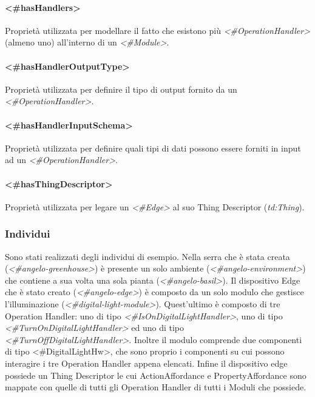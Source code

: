 \paragraph{<\#hasHandlers>}
Proprietà utilizzata per modellare il fatto che esistono più \textit{<\#OperationHandler>} (almeno uno) all'interno di un \textit{<\#Module>}.
\paragraph{<\#hasHandlerOutputType>}
Proprietà utilizzata per definire il tipo di output fornito da un \textit{<\#OperationHandler>}.
\paragraph{<\#hasHandlerInputSchema>}
Proprietà utilizzata per definire quali tipi di dati possono essere forniti in input ad un \textit{<\#OperationHandler>}.
\paragraph{<\#hasThingDescriptor>}
Proprietà utilizzata per legare un \textit{<\#Edge>} al suo Thing Descriptor (\textit{td:Thing}).

\subsubsection{Individui}
Sono stati realizzati degli individui di esempio. Nella serra che è stata creata (\textit{<\#angelo-greenhouse>}) è presente un solo ambiente (\textit{<\#angelo-environment>}) che contiene a sua volta una sola pianta (\textit{<\#angelo-basil>}). Il dispositivo Edge che è stato creato (\textit{<\#angelo-edge>}) è composto da un solo modulo che gestisce l'illuminazione (\textit{<\#digital-light-module>}). Quest'ultimo è composto di tre Operation Handler: uno di tipo \textit{<\#IsOnDigitalLightHandler>}, uno di tipo \textit{<\#TurnOnDigitalLightHandler>} ed uno di tipo \textit{<\#TurnOffDigitalLightHandler>}.
Inoltre il modulo comprende due componenti di tipo <\#DigitalLightHw>, che sono proprio i componenti su cui possono interagire i tre Operation Handler appena elencati. Infine il dispositivo edge possiede un Thing Descriptor le cui ActionAffordance e PropertyAffordance sono mappate con quelle di tutti gli Operation Handler di tutti i Moduli che possiede.
